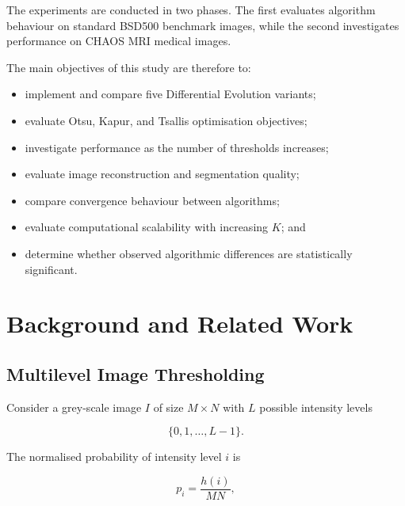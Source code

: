 \documentclass[review]{elsarticle}
\begin{document}
The experiments are conducted in two phases. The first evaluates
algorithm behaviour on standard BSD500 benchmark images, while the
second investigates performance on CHAOS MRI medical images.

The main objectives of this study are therefore to:

\begin{itemize}
    \item implement and compare five Differential Evolution variants;
    \item evaluate Otsu, Kapur, and Tsallis optimisation objectives;
    \item investigate performance as the number of thresholds increases;
    \item evaluate image reconstruction and segmentation quality;
    \item compare convergence behaviour between algorithms;
    \item evaluate computational scalability with increasing $K$; and
    \item determine whether observed algorithmic differences are
          statistically significant.
\end{itemize}



\section{Background and Related Work}
\label{sec:background}


\subsection{Multilevel Image Thresholding}

Consider a grey-scale image $I$ of size $M \times N$ with
$L$ possible intensity levels

\begin{equation}
\{0,1,\ldots,L-1\}.
\end{equation}

The normalised probability of intensity level $i$ is

\begin{equation}
p_i =
\frac{h(i)}{M N},
\end{equation}
\end{document}
